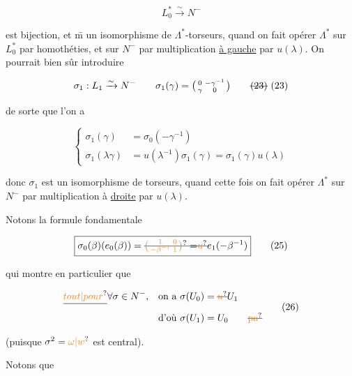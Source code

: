 \[
L_0^*\xrightarrow{\sim}N^-\tag*{(22)}
\]

est bijection, et \={m} un isomorphisme de $\Lambda^*$-torseurs, quand on fait opérer $\Lambda^*$ sur $L_0^*$ par homothéties, et sur $N^-$ par multiplication \uline{à gauche} par $u(\lambda)$. On pourrait bien sûr introduire  

\[
\sigma_1:L_1\xrightarrow{\sim}N^-\qquad \sigma_1(\gamma)=\bigl(\begin{smallmatrix}0&-\gamma^{-1}\\\gamma&0\end{smallmatrix}\bigr)\tag*{\deleted{(23)} (23)}
\]

de sorte que l'on a

\[
\left\{\begin{aligned}
 \sigma_1(\gamma)&=\sigma_0(-\gamma^{-1})\\
 \sigma_1(\lambda\gamma)&=u(\lambda^{-1})\sigma_1(\gamma)=\sigma_1(\gamma)u(\lambda)
\end{aligned}\right.\tag*{(24)}
\]

donc $\sigma_1$ est un isomorphisme de \inserted{$\Lambda^*$-}torseurs, quand cette fois on fait opérer $\Lambda^*$ sur $N^-$ par multiplication à \uline{droite} par $u(\lambda)$.


Notons la formule fondamentale

\[
\boxed{\sigma_0(\beta)(e_0(\beta))=\deleted{\unsure{\bigl(\begin{smallmatrix}1&0\\-\beta^{-1}&1\end{smallmatrix}\bigr)}=}\deleted{\unsure{u}}e_1(-\beta^{-1})}\tag*{(25)}
\]


qui  montre en particulier que

\[
\begin{aligned}
 \deleted{\unsure{tout|pour}}\forall\sigma\in N^-,\quad &\text{on a }\sigma(U_0)=\deleted{\unsure{u}}U_1\\
 &\text{d'où }\sigma(U_1)=U_0\qquad\deleted{\text{\unsure{pa}}}
\end{aligned}\tag*{(26)}
\]

(puisque $\sigma^2=\unsure{\omega|w}$ est central).

Notons que

